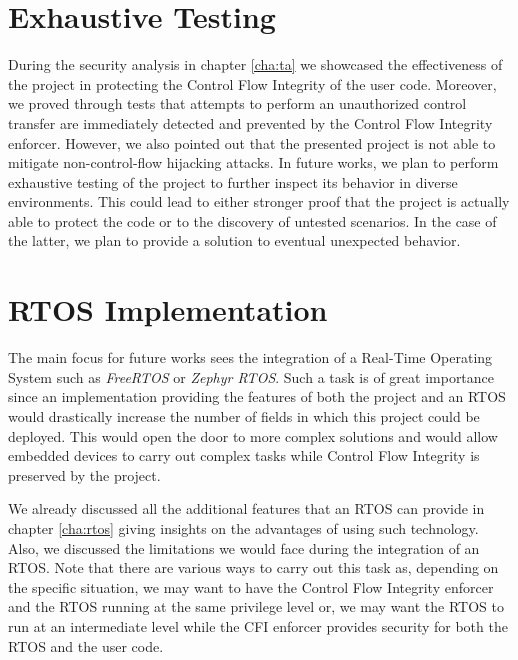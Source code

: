 \section{Exhaustive Testing}
\label{sec:future_testing}

During the security analysis in chapter \ref{cha:ta} we showcased the effectiveness
of the project in protecting the Control Flow Integrity of the user code.
Moreover, we proved through tests that attempts to perform an unauthorized control
transfer are immediately detected and prevented by the Control Flow Integrity enforcer.
However, we also pointed out that the presented project is not able to mitigate non-control-flow
hijacking attacks. In future works, we plan to perform exhaustive testing of the
project to further inspect its behavior in diverse environments. This could lead
to either stronger proof that the project is actually able to protect the code
or to the discovery of untested scenarios. In the case of the latter, we plan to
provide a solution to eventual unexpected behavior.

\section{RTOS Implementation}
\label{sec:future_rtos}

The main focus for future works sees the integration of a Real-Time Operating System
such as \textit{FreeRTOS} or \textit{Zephyr RTOS}. Such a task is of great
importance since an implementation providing the features of both the project
and an RTOS would drastically increase the number of fields in which this
project could be deployed. This would open the door to more complex solutions and
would allow embedded devices to carry out complex tasks while Control Flow Integrity
is preserved by the project.

We already discussed all the additional features that an RTOS can provide in chapter
\ref{cha:rtos} giving insights on the advantages of using such technology. Also,
we discussed the limitations we would face during the integration of an RTOS.
Note that there are various ways to carry out this task as, depending on the specific
situation, we may want to have the Control Flow Integrity enforcer and the RTOS
running at the same privilege level or, we may want the RTOS to run at an intermediate
level while the CFI enforcer provides security for both the RTOS and the user code.

